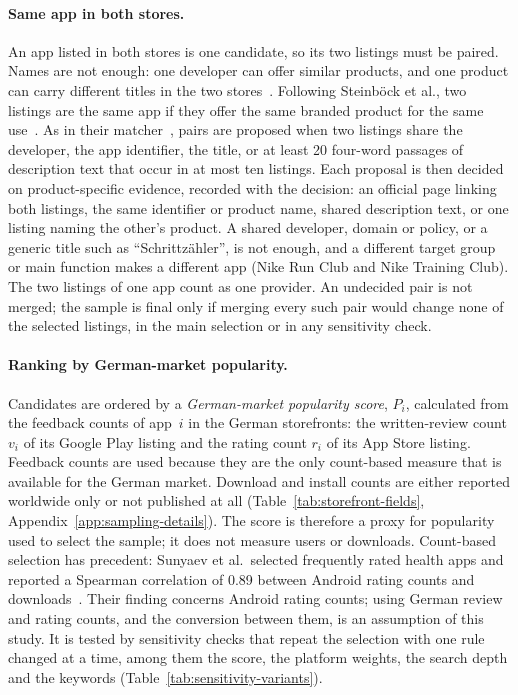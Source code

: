 \paragraph{Same app in both stores.} An app listed in both stores is one
candidate, so its two listings must be paired. Names are not enough: one developer can offer
similar products, and one product can carry different titles in the two
stores~\parencite[\S3.2]{steinboeck2024comparing}. Following Steinböck et al., two listings are
the same app if they offer the same branded product for the same
use~\parencite[\S3.2, p.~352]{steinboeck2024comparing}. As in their
matcher~\parencite[\S3.2.2, p.~353]{steinboeck2024comparing}, pairs are proposed when two
listings share the developer, the app identifier, the title, or at least 20 four-word passages
of description text that occur in at most ten listings. Each proposal is then decided on
product-specific evidence, recorded with the decision: an official page linking both listings,
the same identifier or product name, shared description text, or one listing naming the other's
product. A shared developer, domain or policy, or a generic title such as
\enquote{Schrittzähler}, is not enough, and a different target group or main function makes a
different app (Nike Run Club and Nike Training Club). The two listings of one app count as one
provider. An undecided pair is not merged; the sample is final only if merging every such pair
would change none of the selected listings, in the main selection or in any sensitivity check.

\paragraph{Ranking by German-market popularity.} Candidates are ordered by a
\emph{German-market popularity score}, $P_i$, calculated from the feedback
counts of app~$i$ in the German storefronts: the written-review count $v_i$ of its Google Play
listing and the rating count $r_i$ of its App Store listing. Feedback counts are used because
they are the only count-based measure that is available for the German market. Download and
install counts are either reported worldwide only or not published at all
(Table~\ref{tab:storefront-fields}, Appendix~\ref{app:sampling-details}). The score is
therefore a proxy for popularity used to select the sample; it does not measure
users or downloads. Count-based selection has precedent: Sunyaev et
al.\ selected frequently rated health apps and reported a Spearman correlation
of 0.89 between Android rating counts and downloads~\parencite{sunyaev2015availability}.
Their finding concerns Android rating counts; using German review and rating counts, and the
conversion between them, is an assumption of this study. It is tested by sensitivity checks
that repeat the selection with one rule changed at a time, among them the score, the platform
weights, the search depth and the keywords (Table~\ref{tab:sensitivity-variants}).

